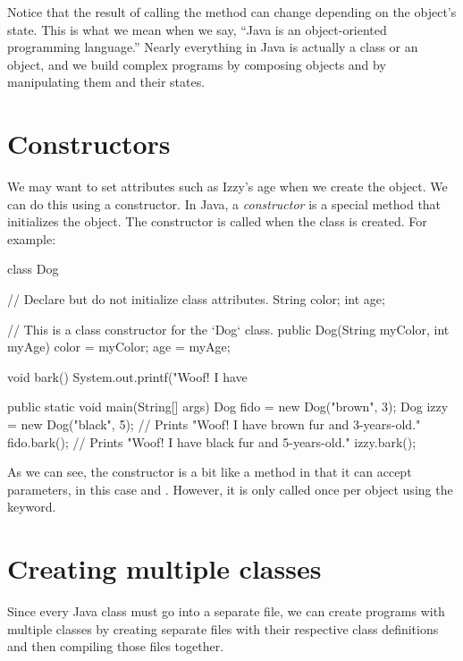 Notice that the result of calling the method  can change depending on the object's state.  This is what we mean when we say, ``Java is an object-oriented programming language.'' Nearly everything in Java is actually a class or an object, and we build complex programs by composing objects and by manipulating them and their states.

\section{Constructors}

We may want to set attributes such as Izzy's age when we create the object. We can do this using a constructor. In Java, a \emph{constructor} is a special method that initializes the object. The constructor is called when the class is created. For example:

\begin{code}
class Dog {

    // Declare but do not initialize class attributes.
    String color;
    int age;
    
    // This is a class constructor for the `Dog` class.
    public Dog(String myColor, int myAge) {
        color = myColor;
        age = myAge;
    }
    
    void bark() {
        System.out.printf("Woof! I have %
    }
    
    public static void main(String[] args) {
        Dog fido = new Dog("brown", 3);
        Dog izzy = new Dog("black", 5);
        // Prints "Woof! I have brown fur and 3-years-old."
        fido.bark();
        // Prints "Woof! I have black fur and 5-years-old."
        izzy.bark();
    }
}
\end{code}

As we can see, the  constructor is a bit like a method in that it can accept parameters, in this case  and . However, it is only called once per object using the  keyword.

\section{Creating multiple classes}

Since every Java class must go into a separate file, we can create programs with multiple classes by creating separate files with their respective class definitions and then compiling those files together.

